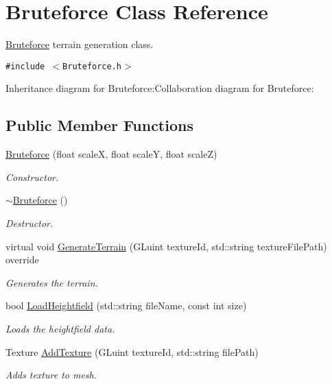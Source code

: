 \hypertarget{class_bruteforce}{
\section{Bruteforce Class Reference}
\label{class_bruteforce}
}
\hyperlink{class_bruteforce}{Bruteforce} terrain generation class.  


{\tt \#include $<$Bruteforce.h$>$}

Inheritance diagram for Bruteforce:Collaboration diagram for Bruteforce:\subsection*{Public Member Functions}
\begin{CompactItemize}
\item 
\hyperlink{class_bruteforce_a34632542f0b77ed5f6faad3515130db}{Bruteforce} (float scaleX, float scaleY, float scaleZ)
\begin{CompactList}\small\item\em Constructor. \item\end{CompactList}\item 
\hyperlink{class_bruteforce_61f92c7ada314e8e785231e86229af1a}{$\sim$Bruteforce} ()
\begin{CompactList}\small\item\em Destructor. \item\end{CompactList}\item 
virtual void \hyperlink{class_bruteforce_910463356742edd6703a19b46f4ed359}{GenerateTerrain} (GLuint textureId, std::string textureFilePath) override
\begin{CompactList}\small\item\em Generates the terrain. \item\end{CompactList}\item 
bool \hyperlink{class_bruteforce_adf9803b858d6d43bc887d7a3506fb2a}{LoadHeightfield} (std::string fileName, const int size)
\begin{CompactList}\small\item\em Loads the heightfield data. \item\end{CompactList}\item 
Texture \hyperlink{class_bruteforce_f4877e16df806562170ba403dc67298f}{AddTexture} (GLuint textureId, std::string filePath)
\begin{CompactList}\small\item\em Adds texture to mesh. \item\end{CompactList}\item 

\end{CompactItemize}
